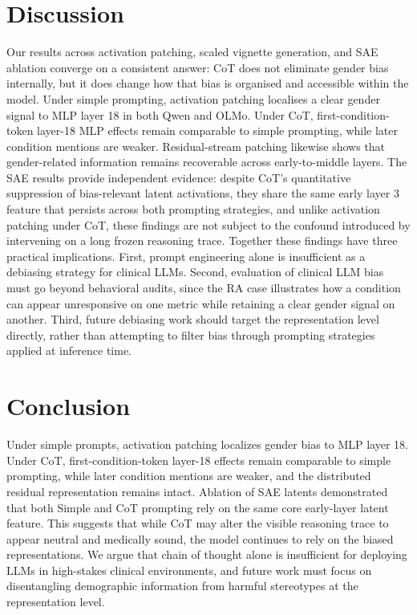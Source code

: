\documentclass{article}
\begin{document}
\section{Discussion}
Our results across activation patching, scaled vignette generation, and SAE ablation converge on a consistent answer: CoT does not eliminate gender bias internally, but it does change how that bias is organised and accessible within the model. Under simple prompting, activation patching localises a clear gender signal to MLP layer 18 in both Qwen and OLMo. Under CoT, first-condition-token layer-18 MLP effects remain comparable to simple prompting, while later condition mentions are weaker. Residual-stream patching likewise shows that gender-related information remains recoverable across early-to-middle layers. The SAE results provide independent evidence: despite CoT's quantitative suppression of bias-relevant latent activations, they share the same early layer 3 feature that persists across both prompting strategies, and unlike activation patching under CoT, these findings are not subject to the confound introduced by intervening on a long frozen reasoning trace. Together these findings have three practical implications. First, prompt engineering alone is insufficient as a debiasing strategy for clinical LLMs. Second, evaluation of clinical LLM bias must go beyond behavioral audits, since the RA case illustrates how a condition can appear unresponsive on one metric while retaining a clear gender signal on another. Third, future debiasing work should target the representation level directly, rather than attempting to filter bias through prompting strategies applied at inference time.

\section{Conclusion}
Under simple prompts, activation patching localizes gender bias to MLP layer 18. Under CoT, first-condition-token layer-18 effects remain comparable to simple prompting, while later condition mentions are weaker, and the distributed residual representation remains intact. Ablation of SAE latents demonstrated that both Simple and CoT prompting rely on the same core early-layer latent feature. This suggests that while CoT may alter the visible reasoning trace to appear neutral and medically sound, the model continues to rely on the biased representations. We argue that chain of thought alone is insufficient for deploying LLMs in high-stakes clinical environments, and future work must focus on disentangling demographic information from harmful stereotypes at the representation level.
\end{document}
